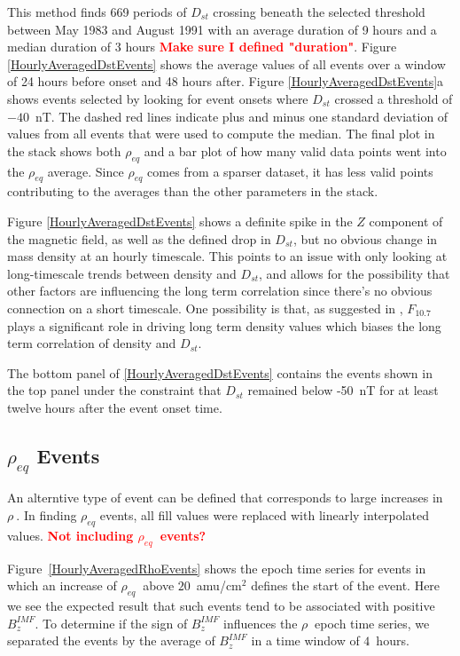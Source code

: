 \documentclass[10pt,twocolumn]{article}
\newcommand{\vinote}[1]{\textcolor{red}{\textbf{#1}}} %
\newcommand{\req}{\ensuremath{\rho_{eq}}}
\newcommand{\inote}[1]{\textcolor{blue}{\textbf{#1}}} %
\def\note#1\par{\textcolor{blue}{\textbf{#1}}\\}
\begin{document}
This method finds 669 periods of $D_{st}$ crossing beneath the selected threshold between May 1983 and August 1991 with an average duration of 9 hours and a median duration of 3 hours \vinote{Make sure I defined "duration"}. Figure \ref{HourlyAveragedDstEvents} shows the average values of all events over a window of 24 hours before onset and 48 hours after. Figure \ref{HourlyAveragedDstEvents}a shows events selected by looking for event onsets where $D_{st}$ crossed a threshold of $-40$~nT. The dashed red lines indicate plus and minus one standard deviation of values from all events that were used to compute the median. The final plot in the stack shows both $\rho_{eq}$ and a bar plot of how many valid data points went into the $\rho_{eq}$ average. Since $\rho_{eq}$ comes from a sparser dataset, it has less valid points contributing to the averages than the other parameters in the stack. 

Figure \ref{HourlyAveragedDstEvents} shows a definite spike in the $Z$ component of the magnetic field, as well as the defined drop in $D_{st}$, but no obvious change in mass density at an hourly timescale. This points to an issue with only looking at long-timescale trends between density and $D_{st}$, and allows for the possibility that other factors are influencing the long term correlation since there's no obvious connection on a short timescale. One possibility is that, as suggested in \cite{Takahashi2010}, $F_{10.7}$ plays a significant role in driving long term density values which biases the long term correlation of density and $D_{st}$.

The bottom panel of \ref{HourlyAveragedDstEvents} contains the events shown in the top panel under the constraint that $D_{st}$ remained below -50~nT for at least twelve hours after the event onset time.

\subsection{$\rho_{eq}$ Events}

An alterntive type of event can be defined that corresponds to large increases in $\rho\ $.  In finding $\rho_{eq}$ events, all fill values were replaced with linearly interpolated values. \vinote{Not including \req\ events?}

Figure~\ref{HourlyAveragedRhoEvents} shows the epoch time series for events in which an increase of $\req\ $ above $20$~amu/cm$^2$ defines the start of the event.  Here we see the expected result that such events tend to be associated with positive $B_z^{IMF}$.  To determine if the sign of $B_z^{IMF}$ influences the $\rho\ $ epoch time series, we separated the events by the average of $B_z^{IMF}$ in a time window of $4$~hours.  
\end{document}

